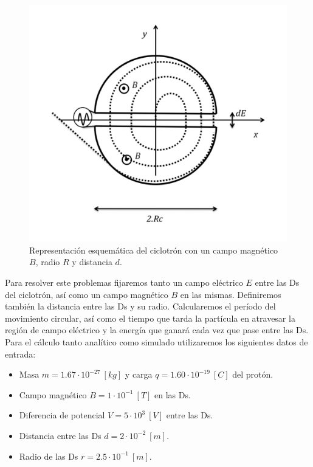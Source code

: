 \documentclass[journal]{IEEEtran}
\begin{document}
\begin{figure}[!htb]
    \includegraphics[width=1\linewidth]{ciclotron.png}
    \caption{Representación esquemática del ciclotrón con un campo magnético $B$, radio $R$ y distancia $d$.}
    \label{fig:ciclotron}
\end{figure}

Para resolver este problemas fijaremos tanto un campo eléctrico $E$ entre las Ds del ciclotrón, así como un campo magnético $B$ en las mismas. Definiremos también la distancia entre las Ds y su radio. Calcularemos el período del movimiento circular, así como el tiempo que tarda la partícula en atravesar la región de campo eléctrico y la energía que ganará cada vez que pase entre las Ds. Para el cálculo tanto analítico como simulado utilizaremos los siguientes datos de entrada:

\begin{itemize}
    \item Masa $m = 1.67\cdot 10^{-27}~[kg]$ y carga $q = 1.60\cdot 10^{-19}~[C]$ del protón.
    \item Campo magnético $B = 1\cdot 10^{-1}~[T]$ en las Ds.
    \item Diferencia de potencial $V = 5\cdot 10^3~[V]$ entre las Ds.
    \item Distancia entre las Ds $d = 2\cdot 10^{-2}~[m]$.
    \item Radio de las Ds $r = 2.5\cdot 10^{-1}~[m]$.
\end{itemize}
\end{document}
